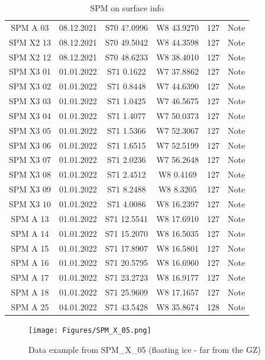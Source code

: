 \documentclass[a4paper,12pt]{article}
\begin{document}
\begin{table}[H]
\begin{tabular}[width=\textwidth]{c c c c c c}
    SPM A 03 & 08.12.2021 & S70 4?.0996 & W8 43.9270 & 127 & Note \\
    SPM X2 13 & 08.12.2021 & S70 49.5042 & W8 44.3598 & 127 & Note \\
    SPM X2 12 & 08.12.2021 & S70 48.6233 & W8 38.4010 & 127 & Note \\
    SPM X3 01 & 01.01.2022 & S71 0.1622 & W7 37.8862 & 127 & Note \\
    SPM X3 02 & 01.01.2022 & S71 0.8448 & W7 44.6390 & 127 & Note \\
    SPM X3 03 & 01.01.2022 & S71 1.0425 & W7 46.5675 & 127 & Note \\
    SPM X3 04 & 01.01.2022 & S71 1.4077 & W7 50.0373 & 127 & Note \\
    SPM X3 05 & 01.01.2022 & S71 1.5366 & W7 52.3067 & 127 & Note \\
    SPM X3 06 & 01.01.2022 & S71 1.6515 & W7 52.5199 & 127 & Note \\
    SPM X3 07 & 01.01.2022 & S71 2.0236 & W7 56.2648 & 127 & Note \\
    SPM X3 08 & 01.01.2022 & S71 2.4512 & W8 0.4169 & 127 & Note \\
    SPM X3 09 & 01.01.2022 & S71 8.2488 & W8 8.3205 & 127 & Note \\
    SPM X3 10 & 01.01.2022 & S71 4.0086 & W8 16.2397 & 127 & Note \\
    SPM A 13 & 01.01.2022 & S71 12.5541 & W8 17.6910 & 127 & Note \\
    SPM A 14 & 01.01.2022 & S71 15.2070 & W8 16.5035 & 127 & Note \\
    SPM A 15 & 01.01.2022 & S71 17.8907 & W8 16.5801 & 127 & Note \\
    SPM A 16 & 01.01.2022 & S71 20.5795 & W8 16.6960 & 127 & Note \\
    SPM A 17 & 01.01.2022 & S71 23.2723 & W8 16.9177 & 127 & Note \\
    SPM A 18 & 01.01.2022 & S71 25.9609 & W8 17.1657 & 127 & Note \\
    SPM A 25 & 04.01.2022 & S71 43.5428 & W8 35.8674 & 128 & Note \\
    \hline
  \end{tabular}
  \caption{SPM on surface info}
  \label{Table_SPM_surface}
\end{table}

\begin{figure}[H]
	\texttt{[image: Figures/SPM\_X\_05.png]}
	\caption{Data example from SPM\_X\_05 (floating ice - far from the GZ)}
	\label{fig_SPM_X_05}
\end{figure}
\end{document}
